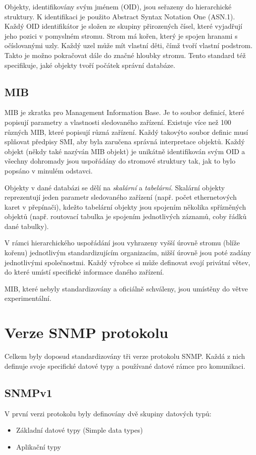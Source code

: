 Objekty, identifikovány svým jménem (OID), jsou seřazeny do hierarchické struktury. K identifikaci je použito Abstract Syntax Notation One (ASN.1). Každý OID identifikátor je složen ze skupiny přirozených čísel, které
vyjadřují jeho pozici v pomyslném stromu. Strom má kořen, který je spojen hranami s očíslovanými uzly. Každý uzel může mít vlastní děti, čímž tvoří vlastní podstrom. Takto je možno pokračovat dále do značné hloubky stromu. 
Tento standard též specifikuje, jaké objekty tvoří počátek správní databáze.

\subsection*{MIB}
MIB je zkratka pro Management Information Base. Je to soubor definicí, které popisují parametry a vlastnosti sledovaného zařízení. Existuje více než 100 různých MIB, které popisují různá zařízení. Každý takovýto
soubor definic musí splňovat předpisy SMI, aby byla zaručena správná interpretace objektů. Každý objekt (někdy také nazýván MIB objekt) je unikátně identifikován svým OID a všechny dohromady jsou uspořádány do
stromové struktury tak, jak to bylo popsáno v minulém odstavci. 

Objekty v dané databázi se dělí na \textit{skalární} a \textit{tabelární}. Skalární objekty reprezentují jeden parametr sledovaného zařízení (např. počet ethernetových karet v přepínači), kdežto tabelární objekty
jsou spojením několika spřízněných objektů (např. routovací tabulka je spojením jednotlivých záznamů, coby řádků dané tabulky).

V rámci hierarchického uspořádání jsou vyhrazeny vyšší úrovně stromu (blíže kořenu) jednotlivým standardizujícím organizacím, nižší úrovně jsou poté zadány jednotlivými společnostmi. Každý výrobce si může definovat svojí
privátní větev, do které umístí specifické informace daného zařízení.

MIB, které nebyly standardizovány a oficiálně schváleny, jsou umístěny do větve experimentální.


\section{Verze SNMP protokolu}
Celkem byly doposud standardizovány tři verze protokolu SNMP. Každá z nich definuje svoje specifické datové typy a používané datové rámce pro komunikaci. 

\subsection*{SNMPv1}
V první verzi protokolu byly definovány dvě skupiny datových typů:
\begin{itemize}
	\item Základní datové typy (Simple data types)
	\item Aplikační typy
\end{itemize}


